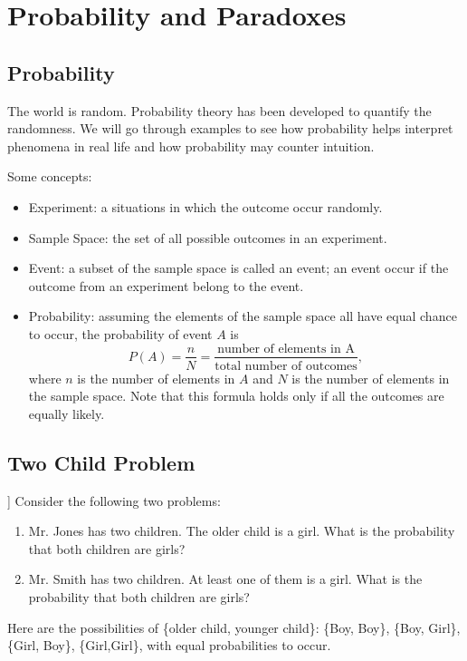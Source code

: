 \hypertarget{ch:probability}{%
\chapter{Probability and Paradoxes}\label{ch:probability}}

\hypertarget{probability}{%
\section{Probability}\label{probability}}

The world is random. Probability theory has been developed to quantify the
randomness. We will go through examples to see how probability helps
interpret phenomena in real life and how probability may counter
intuition.

Some concepts:
\begin{itemize}
\item Experiment: a situations in which the outcome occur randomly.
\item Sample Space: the set of all possible outcomes in an experiment.
\item Event: a subset of the sample space is called an event; an event
  occur if the outcome from an experiment belong to the event.
\item Probability: assuming the elements of the sample space all have
  equal chance to occur, the probability of event $A$ is\\
  \begin{equation*}
    P(A)=\frac{n}{N}
    =\frac{\text{number of elements in A}}{\text{total number of outcomes}},
  \end{equation*}
  where \(n\) is the number of elements in \(A\) and \(N\) is the
  number of elements in the sample space.  Note that this formula
  holds only if all the outcomes are equally likely.
\end{itemize}

\hypertarget{Two-Child}{%
  \section{Two Child Problem}\label{Two-Child}}

\begin{example}[[Two Child Problem]]
Consider the following two problems:
\begin{enumerate}
\item Mr. Jones has two children. The older child is a girl. What is the
  probability that both children are girls?
\item Mr. Smith has two children. At least one of them is a girl. What is the
  probability that both children are girls?
\end{enumerate}
\end{example}
Here are the possibilities of \{older child, younger child\}:
\{Boy, Boy\}, \{Boy, Girl\}, \{Girl, Boy\}, \{Girl,Girl\}, with equal probabilities to occur. 

